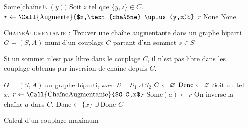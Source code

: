 \begin{algorithm}[H]
	\centering
	\begin{algorithmic}[1]
					\State\Return $\mathrm{Some}\big(\text{chaîne} \uplus (y)\big)$\/
				\Else
					\State Soit $z$\/ tel que $\{y,z\} \in C$.
					\State $r \gets \text{\Call{Augmente}{$z,\text{chaîne} \uplus (y,z)$}}$\/ 
						\State\Return $r$\/
					\EndIf
					\State\Return $\mathrm{None}$\/
				\EndIf
			\EndFor
		\EndProcedure
			\State\Return {}
		\Else
			\State\Return $\mathrm{None}$\/
		\EndIf
	\end{algorithmic}
	\caption{\textsc{ChaîneAugmentante} : Trouver une chaîne augmentante dans un graphe biparti $G = (S, A)$\/ muni d'un couplage $C$\/ partant d'un sommet $s \in S$ }
\end{algorithm}

\begin{rmk}
	Si un sommet n'est pas libre dans le couplage $C$, il n'est pas libre dans les couplage obtenus par inversion de chaîne depuis $C$.
\end{rmk}

\begin{algorithm}[H]
	\centering
	\begin{algorithmic}[1]
		\Entree $G = (S, A)$\/ un graphe biparti, avec $S = S_1 \cupdot S_2$\/
		\State $C \gets\varnothing$\/ 
		\State $\mathrm{Done} \gets \varnothing$\/ 
			\State Soit un tel $x$.
			\State $r \gets \text{\Call{ChaîneAugmentante}{$G,C,x$}}$\/
				\State $\mathrm{Some}(a) \gets r$\/
				\State On inverse la chaîne $a$\/ dans $C$.
			\EndIf
			\State $\mathrm{Done} \gets \{x\} \cup \mathrm{Done}$\/
		\EndWhile
		\State\Return $C$\/
	\end{algorithmic}
	\caption{Calcul d'un couplage maximum}
\end{algorithm}



